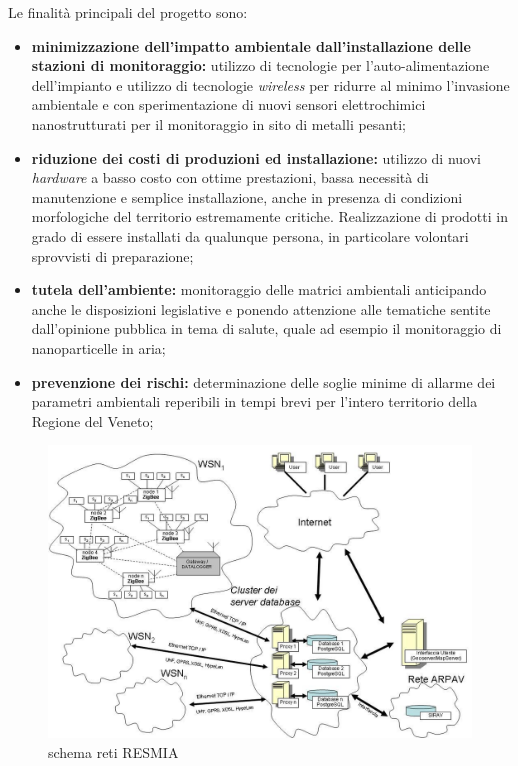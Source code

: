 Le finalità principali del progetto sono:
\begin{itemize}

	\item \textbf{minimizzazione dell'impatto ambientale dall'installazione delle stazioni di monitoraggio:} utilizzo di tecnologie per l'auto-alimentazione dell'impianto e utilizzo di tecnologie \textit{wireless} per ridurre al minimo l'invasione ambientale e con sperimentazione di nuovi sensori elettrochimici nanostrutturati per il monitoraggio in sito di metalli pesanti;
	\item \textbf{riduzione dei costi di produzioni ed installazione:} utilizzo di nuovi \textit{hardware} a basso costo con ottime prestazioni, bassa necessità di manutenzione e semplice installazione, anche in presenza di condizioni morfologiche del territorio estremamente critiche. Realizzazione di prodotti in grado di essere installati da qualunque persona, in particolare volontari sprovvisti di preparazione;
	\item \textbf{tutela dell'ambiente:} monitoraggio delle matrici ambientali anticipando anche le disposizioni legislative e ponendo attenzione alle tematiche sentite dall'opinione pubblica in tema di salute, quale ad esempio il monitoraggio di nanoparticelle in aria;
	\item \textbf{prevenzione dei rischi:} determinazione delle soglie minime di allarme dei parametri ambientali reperibili in tempi brevi per l'intero territorio della Regione del Veneto;

\end{itemize}

\begin{figure}[htbp]
\centering
\includegraphics[scale=0.3]{./capitoli/capitolo1/img/retiresmia}
\caption{schema reti RESMIA}
\end{figure}

